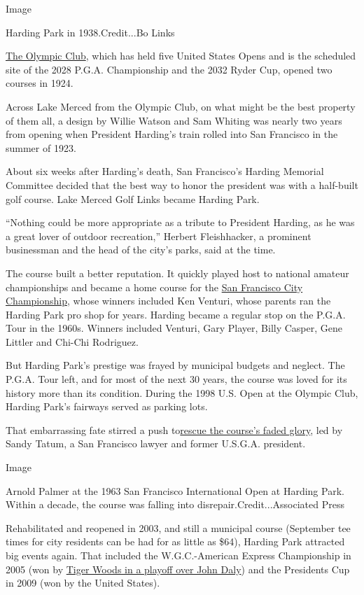 Image

Harding Park in 1938.Credit...Bo Links

\href{https://www.olyclub.com/golf-course-tours/}{The Olympic Club},
which has held five United States Opens and is the scheduled site of the
2028 P.G.A. Championship and the 2032 Ryder Cup, opened two courses in
1924.

Across Lake Merced from the Olympic Club, on what might be the best
property of them all, a design by Willie Watson and Sam Whiting was
nearly two years from opening when President Harding's train rolled into
San Francisco in the summer of 1923.

About six weeks after Harding's death, San Francisco's Harding Memorial
Committee decided that the best way to honor the president was with a
half-built golf course. Lake Merced Golf Links became Harding Park.

``Nothing could be more appropriate as a tribute to President Harding,
as he was a great lover of outdoor recreation,'' Herbert Fleishhacker, a
prominent businessman and the head of the city's parks, said at the
time.

The course built a better reputation. It quickly played host to national
amateur championships and became a home course for the
\href{http://sfgolfchampionship.com/about-the-san-francisco-city-championship/}{San
Francisco City Championship}, whose winners included Ken Venturi, whose
parents ran the Harding Park pro shop for years. Harding became a
regular stop on the P.G.A. Tour in the 1960s. Winners included Venturi,
Gary Player, Billy Casper, Gene Littler and Chi-Chi Rodriguez.

But Harding Park's prestige was frayed by municipal budgets and neglect.
The P.G.A. Tour left, and for most of the next 30 years, the course was
loved for its history more than its condition. During the 1998 U.S. Open
at the Olympic Club, Harding Park's fairways served as parking lots.

That embarrassing fate stirred a push
to\href{https://www.golfdigest.com/story/golf_harding_park_jaime_diaz}{rescue
the course's faded glory}, led by Sandy Tatum, a San Francisco lawyer
and former U.S.G.A. president.

Image

Arnold Palmer at the 1963 San Francisco International Open at Harding
Park. Within a decade, the course was falling into
disrepair.Credit...Associated Press

Rehabilitated and reopened in 2003, and still a municipal course
(September tee times for city residents can be had for as little as
\$64), Harding Park attracted big events again. That included the
W.G.C.-American Express Championship in 2005 (won by
\href{https://www.youtube.com/watch?v=j6YSXKHxLYo}{Tiger Woods in a
playoff over John Daly}) and the Presidents Cup in 2009 (won by the
United States).

